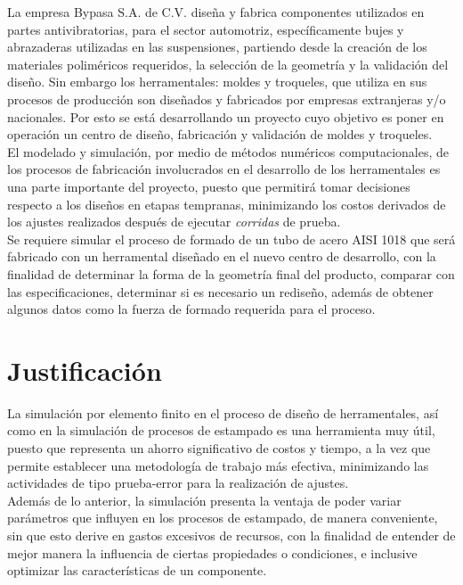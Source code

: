 La empresa Bypasa S.A. de C.V. diseña y fabrica componentes utilizados en partes antivibratorias, 
para el sector automotriz, específicamente bujes y abrazaderas utilizadas en las suspensiones, 
partiendo desde la creación de los materiales poliméricos requeridos, la selección de la geometría 
y la validación del diseño. Sin embargo los herramentales: moldes y troqueles, que utiliza en sus 
procesos de producción son diseñados y fabricados por empresas extranjeras y/o nacionales. Por esto 
se está desarrollando un proyecto cuyo objetivo es poner en operación un centro de diseño, fabricación 
y validación de moldes y troqueles.\\

El modelado y simulación, por medio de métodos numéricos computacionales, de los procesos de fabricación 
involucrados en el desarrollo de los herramentales es una parte importante del proyecto, puesto que 
permitirá tomar decisiones respecto a los diseños en etapas tempranas, minimizando los costos derivados de 
los ajustes realizados después de ejecutar \textit{corridas} de prueba.\\

Se requiere simular el proceso de formado de un tubo de acero AISI 1018 que será fabricado con 
un herramental diseñado en el nuevo centro de desarrollo, con la finalidad de determinar 
la forma de la geometría final del producto, comparar con las especificaciones, determinar 
si es necesario un rediseño, además de obtener algunos datos como la fuerza de formado 
requerida para el proceso. 

\section{Justificación}

La simulación por elemento finito en el proceso de diseño de herramentales, así como en 
la simulación de procesos de estampado es una herramienta muy útil, puesto que representa un ahorro 
significativo de costos y tiempo, a la vez que permite establecer una metodología de trabajo más efectiva, minimizando las 
actividades de tipo prueba-error para la realización de ajustes.\\

Además de lo anterior, la simulación presenta la ventaja de poder variar parámetros que influyen en los procesos de 
estampado, de manera conveniente, sin que esto derive en gastos excesivos de recursos, con la finalidad de entender 
de mejor manera la influencia de ciertas propiedades o condiciones, e inclusive optimizar las características 
de un componente.



